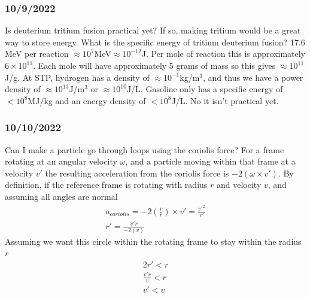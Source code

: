 \documentclass[12pt]{article}
\begin{document}
\subsubsection{10/9/2022}
Is deuterium tritium fusion practical yet? If so, making tritium would be a great way to store energy. What is the specific energy of tritium deuterium fusion? 17.6 MeV per reaction $\approx10^7$MeV$\approx10^{-12}$J. Per mole of reaction this is approximately $6\times10^{11}$. Each mole will have approximately 5 grams of mass so this gives $\approx10^{11}$J/g. At STP, hydrogen has a density of $\approx10^{-1}$kg/m$^3$, and thus we have a power density of $\approx10^{13}$J/m$^3$ or $\approx10^{10}$J/L. Gasoline only has a specific energy of $<10^8$MJ/kg and an energy density of $<10^8$J/L. No it isn't practical yet. \\
\subsubsection{10/10/2022}
Can I make a particle go through loops using the coriolis force? For a frame rotating at an angular velocity $\omega$, and a particle moving within that frame at a velocity $v'$ the resulting acceleration from the coriolis force is $-2(\omega\times v')$. By definition, if the reference frame is rotating with radius $r$ and velocity $v$, and assuming all angles are normal 
\begin{equation}
\begin{split}
a_{coriolis} = -2(\frac{v}{r})\times v' = \frac{v'^2}{r'}\\
r' = \frac{v'r}{-2(v)}
\end{split}
\end{equation}
Assuming we want this circle within the rotating frame to stay within the radius $r$
\begin{equation}
\begin{split}
2r' < r\\
\frac{v'r}{v} < r\\
v' < v\\
\end{split}
\end{equation}
\end{document}
